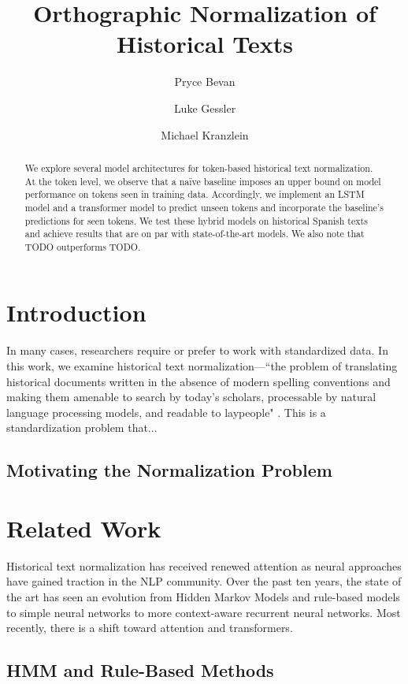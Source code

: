 \documentclass[11pt,a4paper]{article}
\title{Orthographic Normalization of Historical Texts}
\author{Pryce Bevan}
\author{Luke Gessler}
\author{Michael Kranzlein}
\affil{Georgetown University\\ Department of Computer Science}
\affil{\{\tt pwb8, lg876, mmk119\}@georgetown.edu}
\date{}
\begin{document}
\maketitle

\begin{abstract}
We explore several model architectures for token-based historical text normalization. At the token level, we observe that a na\"ive baseline imposes an upper bound on model performance on tokens seen in training data. Accordingly, we implement an LSTM model and a transformer model to predict unseen tokens and incorporate the baseline's predictions for seen tokens. We test these hybrid models on historical Spanish texts and achieve results that are on par with state-of-the-art models. We also note that TODO outperforms TODO.
\end{abstract}

\section{Introduction}
In many cases, researchers require or prefer to work with standardized data. In this work, we examine historical text normalization---``the problem of translating historical documents written in the absence of modern spelling conventions and making them amenable to search by today’s scholars, processable by natural language processing models, and readable to laypeople" \cite{bollmann_multi-task_2018}. This is a standardization problem that...

\subsection{Motivating the Normalization Problem}

\section{Related Work}
Historical text normalization has received renewed attention as neural approaches have gained traction in the NLP community. Over the past ten years, the state of the art has seen an evolution from Hidden Markov Models and rule-based models to simple neural networks to more context-aware recurrent neural networks. Most recently, there is a shift toward attention and transformers.
\subsection{HMM and Rule-Based Methods}
\end{document}
